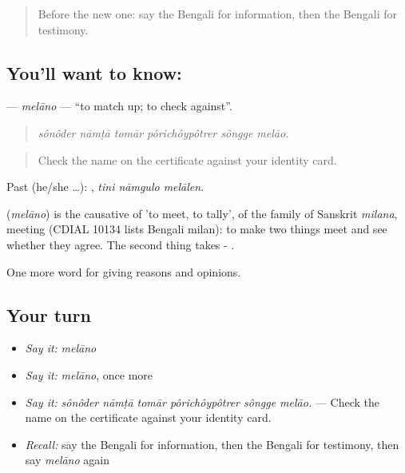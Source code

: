 \begin{quote}
Before the new one: say the Bengali for information, then the Bengali for testimony.
\end{quote}

\subsection*{You'll want to know: }
\textbf{} — \emph{melāno} — \textquotedblleft{}to match up; to check against\textquotedblright{}.

\begin{quote}
     
\end{quote}

\begin{quote}
\emph{sônôder nāmṭā tomār pôrichôypôtrer sôngge melāo.}
\end{quote}

\begin{quote}
Check the name on the certificate against your identity card.
\end{quote}

Past (he/she …):   , \emph{tini nāmgulo melālen}.

\begin{cousinweb}
\textbf{} (\emph{melāno}) is the causative of  'to meet, to tally', of the family of Sanskrit \emph{milana}, meeting (CDIAL 10134 lists Bengali milan): to make two things meet and see whether they agree. The second thing takes - .
\end{cousinweb}

\begin{grammarlens}[title={What you've built}]
One more word for giving reasons and opinions.
\end{grammarlens}

\subsection*{Your turn}
\begin{itemize}
\raggedright
  \item \emph{Say it:} \emph{melāno}
  \item \emph{Say it:} \emph{melāno}, once more
  \item \emph{Say it:} \emph{sônôder nāmṭā tomār pôrichôypôtrer sôngge melāo.} — Check the name on the certificate against your identity card.
  \item \emph{Recall:} say the Bengali for information, then the Bengali for testimony, then say \emph{melāno} again
\end{itemize}

